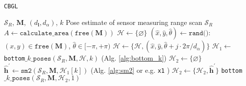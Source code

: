 \begin{algorithm}
  \caption{\texttt{CBGL}}
  \begin{spacing}{1.2}
  \begin{algorithmic}[1]
    \REQUIRE $\mathcal{S}_R$, $\bm{M}$, $(d_{\bm{l}}, d_\alpha)$, $k$
    \ENSURE Pose estimate of sensor measuring range scan $\mathcal{S}_R$ %
    \STATE $A \leftarrow \texttt{calculate\_area}(\texttt{free}(\bm{M}))$
    \STATE $\mathcal{H} \leftarrow \{\varnothing\}$
      \STATE \small $(\hat{x},\hat{y},\hat{\theta}) \leftarrow \texttt{rand()}$: $(x,y) \in \texttt{free}(\bm{M})$, $\hat{\theta} \in [-\pi,+\pi)$
        \STATE $\mathcal{H} \leftarrow \{\mathcal{H}, (\hat{x}, \hat{y}, \hat{\theta} + j \cdot 2\pi / d_{\alpha})\}$
      \ENDFOR
    \ENDFOR
    \STATE $\mathcal{H}_1 \leftarrow$ \texttt{bottom}$\_k\_\texttt{poses}(\mathcal{S}_R, \bm{M}, \mathcal{H}, k)$ \hfill {\small (Alg. \ref{alg:bottom_k}})
    \STATE $\mathcal{H}_2 \leftarrow \{\varnothing \}$
      \STATE $\hat{\bm{h}}^\prime \leftarrow \texttt{sm2}(\mathcal{S}_R, \bm{M}, \mathcal{H}_1[k])$ \hfill {\small (Alg. \ref{alg:sm2} or e.g. \texttt{x1} \cite{Filotheou2023a}})
      \STATE $\mathcal{H}_2 \leftarrow \{\mathcal{H}_2, \hat{\bm{h}}^\prime\}$
    \ENDFOR
    \RETURN \texttt{bottom}$\_k\_\texttt{poses}(\mathcal{S}_R, \bm{M}, \mathcal{H}_2, 1)$
  \end{algorithmic}
  \end{spacing}
  \label{alg:cbgl}
\end{algorithm}

